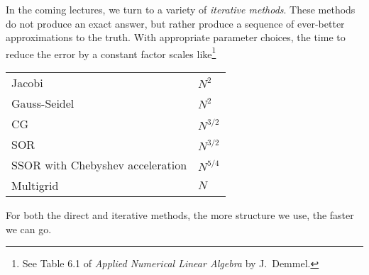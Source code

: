 \documentclass[12pt, leqno]{article} %
\begin{document}
In the coming lectures, we turn to a variety of {\em iterative methods}.
These methods do not produce an exact answer, but rather produce a
sequence of ever-better approximations to the truth.
With appropriate parameter choices,
the time to reduce the error by a constant factor scales
like\footnote{%
See Table 6.1 of {\em Applied Numerical Linear Algebra} by J.~Demmel.}
\begin{center}
\begin{tabular}{ll}
  Jacobi & $N^2$ \\
  Gauss-Seidel & $N^2$ \\
  CG & $N^{3/2}$ \\
  SOR & $N^{3/2}$ \\
  SSOR with Chebyshev acceleration & $N^{5/4}$ \\
  Multigrid & $N$
\end{tabular}
\end{center}
For both the direct and iterative methods, the more structure we use,
the faster we can go.
\end{document}
